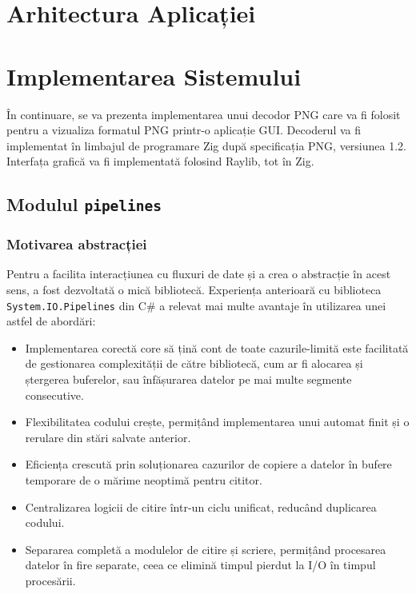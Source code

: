 \documentclass[a4paper,12pt]{report}
\begin{document}

\chapter{Arhitectura Aplicației}\label{architecture_chapter_title}



\chapter{Implementarea Sistemului}\label{implementation_chapter_title}

În continuare, se va prezenta implementarea unui decodor \ac{PNG} care va fi folosit pentru
a vizualiza formatul \ac{PNG} printr-o aplicație \ac{GUI}.
Decoderul va fi implementat în limbajul de programare Zig\cite{zig}
după specificația \ac{PNG}, versiunea 1.2\cite{png_spec}.
Interfața grafică va fi implementată folosind Raylib\cite{raylib}, tot în Zig.

\section{Modulul \texttt{pipelines}}

\subsection{Motivarea abstracției}

Pentru a facilita interacțiunea cu fluxuri de date și a crea o abstracție în acest sens,
a fost dezvoltată o mică bibliotecă.
Experiența anterioară cu biblioteca \texttt{System.IO.Pipelines}\cite{system_io_pipelines}
din C\# a relevat mai multe avantaje în utilizarea unei astfel de abordări:
\begin{itemize}
  \item
  Implementarea corectă core să țină cont de toate cazurile-limită
  este facilitată de gestionarea complexității de către
  bibliotecă, cum ar fi alocarea și ștergerea buferelor,
  sau înfășurarea datelor pe mai multe segmente consecutive.

  \item
  Flexibilitatea codului crește, permițând implementarea unui automat finit
  și o rerulare din stări salvate anterior.

  \item
  Eficiența crescută prin soluționarea cazurilor de copiere a datelor în bufere temporare
  de o mărime neoptimă pentru cititor.

  \item
  Centralizarea logicii de citire într-un ciclu unificat,
  reducând duplicarea codului.

  \item
  Separarea completă a modulelor de citire și scriere,
  permițând procesarea datelor în fire separate,
  ceea ce elimină timpul pierdut la \ac{I/O} în timpul procesării.
\end{itemize}
\end{document}
